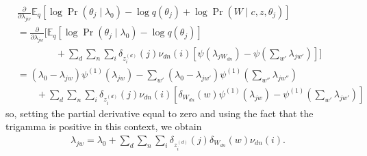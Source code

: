 \documentclass{article}
\newcommand{\digamma}[1]{\ensuremath{\psi\left(#1\right)}}
\newcommand{\trigamma}[1]{\ensuremath{\psi^{(1)}\left(#1\right)}}
\newcommand{\Elogdirichlet}[2]{\ensuremath{\digamma{#1} - \digamma{#2}}}
\newcommand{\Eq}{\ensuremath{\mathbb{E}_q\xspace}}
\newcommand{\pd}[1]{\ensuremath{\frac{\partial}{\partial #1}}}
\begin{document}
\begin{align*}
    &\pd{\lambda_{jw}} \Eq \left[ \log \Pr(\theta_j \mid \lambda_0) - \log q(\theta_j) + \log \Pr(W \mid c, z, \theta_j) \right] \\
    &= \pd{\lambda_{jw}} \Bigg[
        \Eq \left[ \log \Pr(\theta_j \mid \lambda_0) - \log q(\theta_j) \right] \\
        &\qquad\qquad + \sum_d \sum_n \sum_i \delta_{z_i^{(d)}}(j) \nu_{dn}(i) \left[ \Elogdirichlet{\lambda_{j W_{dn}}}{\sum_{w'}{\lambda_{jw'}}} \right] 
    \Bigg] \\
    &= (\lambda_0 - \lambda_{jw}) \trigamma{\lambda_{jw}} - \sum_{w'} (\lambda_0 - \lambda_{jw'}) \trigamma{\sum_{w''}{\lambda_{jw''}}} \\
        &\qquad + \sum_d \sum_n \sum_i \delta_{z_i^{(d)}}(j) \nu_{dn}(i) \left[ \delta_{W_{dn}}(w) \trigamma{\lambda_{j w}} - \trigamma{\sum_{w'}{\lambda_{jw'}}} \right]
\end{align*}
so, setting the partial derivative equal to zero and using the fact that the trigamma is positive in this context, we obtain
\begin{align*}
    \boxed{ \lambda_{jw} = \lambda_0 + \sum_d \sum_n \sum_i \delta_{z_i^{(d)}}(j) \delta_{W_{dn}}(w) \nu_{dn}(i) }.
\end{align*}
\end{document}
